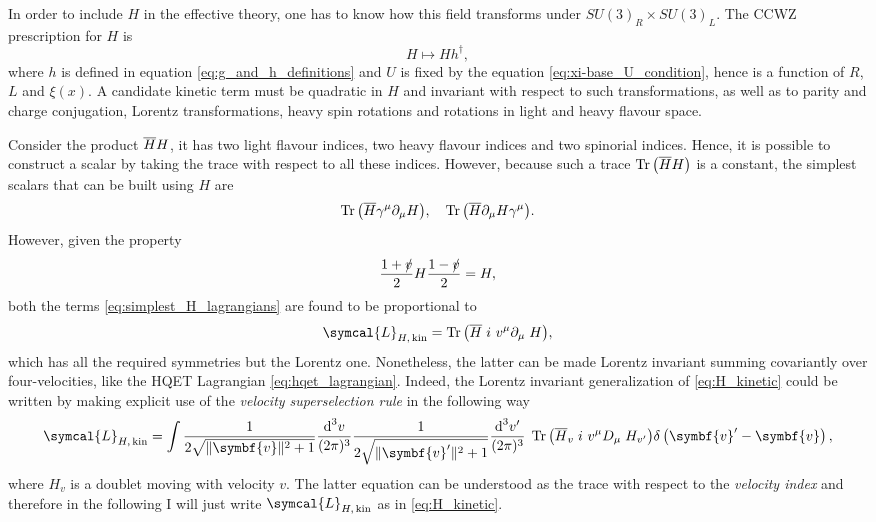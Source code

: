 In order to include $H$ in the effective theory, one has to know how this field transforms under $SU(3)_R \times SU(3)_L$. The CCWZ prescription for $H$ is
\begin{equation}
  H \mapsto H h^\dagger ,
  \label{eq:h_transformation_law}
\end{equation}
where $h$ is defined in equation \eqref{eq:g_and_h_definitions} and $U$ is fixed by the equation \eqref{eq:xi-base_U_condition}, hence is a function of $R$, $L$ and $\xi (x)$. A candidate kinetic term must be quadratic in $H$ and invariant with respect to such transformations, as well as to parity and charge conjugation, Lorentz transformations, heavy spin rotations and rotations in light and heavy flavour space.

Consider the product $\overline{H} H$, it has two light flavour indices, two heavy flavour indices and two spinorial indices. Hence, it is possible to construct a scalar by taking the trace with respect to all these indices. However, because such a trace $\operatorname{Tr}{\left(\overline{H} H \right)}$ is a constant, the simplest scalars that can be built using $H$ are
\begin{equation}
  \operatorname{Tr}{\left( \overline{H} \gamma^\mu \partial_\mu H \right)} , \quad \operatorname{Tr}{\left( \overline{H} \partial_\mu H \gamma^\mu \right)} .
  \label{eq:simplest_H_lagrangians}
\end{equation}
However, given the property
\begin{equation}
  \frac{1 + \slashed{v}}{2} H \frac{1 - \slashed{v}}{2} = H ,
  \label{eq:H_positive_energy}
\end{equation}
both the terms \eqref{eq:simplest_H_lagrangians} are found to be proportional to
\begin{equation}
  \symcal{L}_{H, \, \text{kin}} = \tr{\left( \adj{H} \left. i \ v^\mu \partial_\mu \right. H \right)} ,
  \label{eq:H_kinetic}
\end{equation}
which has all the required symmetries but the Lorentz one. Nonetheless, the latter can be made Lorentz invariant summing covariantly over four-velocities, like the HQET Lagrangian \eqref{eq:hqet_lagrangian}. Indeed, the Lorentz invariant generalization of \eqref{eq:H_kinetic} could be written by making explicit use of the \emph{velocity superselection rule} in the following way
\begin{equation}
  \symcal{L}_{H , \, \text{kin}} = \int \frac{1}{2 \sqrt{\Vert \symbf{v} \Vert^2 + 1}} \frac{\D^3 \! v}{(2 \pi)^3} \frac{1}{2 \sqrt{\Vert \symbf{v}' \Vert^2 + 1}} \frac{\D^3 \! v'}{(2 \pi)^3} \; \tr{\left(\adj{H}_v \left. i \ v^\mu D_\mu \right. H_{v'} \right)} \delta \left( \symbf{v}' - \symbf{v} \right) ,
\end{equation}
where $H_v$ is a doublet moving with velocity $v$. The latter equation can be understood as the trace with respect to the \emph{velocity index} and therefore in the following I will just write $\symcal{L}_{H, \, \text{kin}}$ as in \eqref{eq:H_kinetic}.

